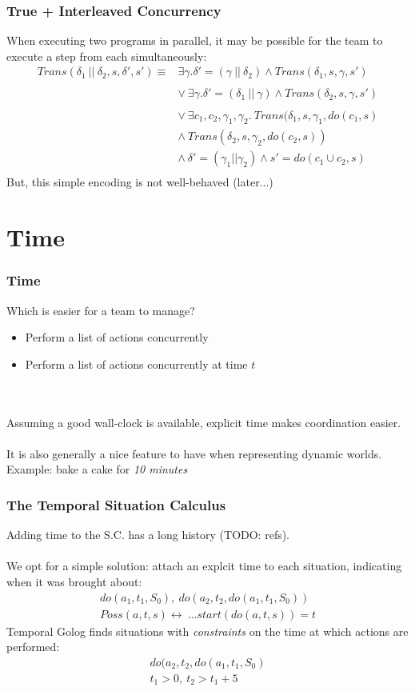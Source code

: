 \documentclass{beamer}
\begin{document}
\begin{frame}
\frametitle{True + Interleaved Concurrency}
When executing two programs in parallel, it may be possible for the team to
execute a step from each simultaneously:\[
\begin{array}{cc}
Trans(\delta_1\ ||\ \delta_2,s,\delta',s') \equiv & \exists \gamma . \delta'=(\gamma\ ||\ \delta_2)\wedge Trans(\delta_1,s,\gamma,s')\\
& \\
& \vee\ \exists \gamma . \delta'=(\delta_1\ ||\ \gamma)\wedge Trans(\delta_2,s,\gamma,s')\\
& \\
& \vee\ \exists c_1,c_2,\gamma_1,\gamma_2.\ Trans(\delta_1,s,\gamma_1,do(c_1,s)\\
& \wedge\ Trans(\delta_2,s,\gamma_2,do(c_2,s))\\
& \wedge\ \delta'=(\gamma_1||\gamma_2) \wedge s'=do(c_1 \cup c_2,s)\\
\end{array}\]
But, this simple encoding is not well-behaved (later...)
\end{frame}

\section{Time}

\begin{frame}
\frametitle{Time}
Which is easier for a team to manage?
\begin{itemize}
  \pause
  \item Perform a list of actions concurrently
  \pause
  \item Perform a list of actions concurrently at time $t$
\end{itemize}
\ \\
\ \\
\pause
Assuming a good wall-clock is available, explicit time makes coordination easier.\\
\ \\
It is also generally a nice feature to have when representing dynamic worlds.
Example: bake a cake for \emph{10 minutes}
\end{frame}

\begin{frame}
\frametitle{The Temporal Situation Calculus}
Adding time to the S.C. has a long history (TODO: refs).\\
\ \\
We opt for a simple solution: attach an explcit time to each situation,
indicating when it was brought about:\[
\begin{array}{c}
do(a_1,t_1,S_0),\ do(a_2,t_2,do(a_1,t_1,S_0))\\
Poss(a,t,s) \leftrightarrow\ \dots
start(do(a,t,s)) = t
\end{array}\]
\pause
Temporal Golog finds situations with \emph{constraints} on the
time at which actions are performed:\[
\begin{array}{c}
do(a_2,t_2,do(a_1,t_1,S_0)\\
t_1>0,\ t_2>t_1+5
\end{array}\]
\end{frame}
\end{document}
